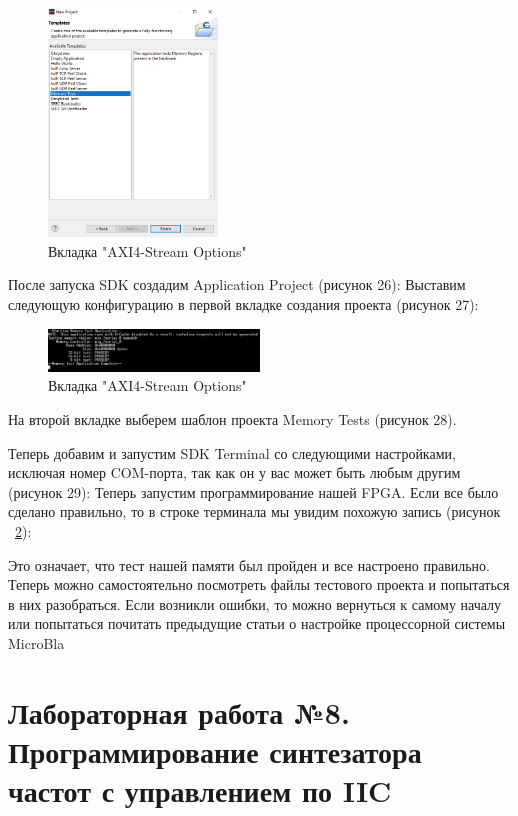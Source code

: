 \documentclass[a4paper,oneside ,10pt]{extreport}
\begin{document}
\begin{figure}[h]
	\centering
	\includegraphics[width=0.4\textwidth]{image/mig_m_sdk_1.png}
	\caption{Вкладка "AXI4-Stream Options"}
	\label{mig_m_sdk_1}
\end{figure}

    После запуска SDK создадим Application Project (рисунок 26):
    Выставим следующую конфигурацию в первой вкладке создания проекта (рисунок 27):
\begin{figure}[h]
	\centering
	\includegraphics[width=0.5\textwidth]{image/mig_result.png}
	\caption{Вкладка "AXI4-Stream Options"}
	\label{mig_result}
\end{figure}
    На второй вкладке выберем шаблон проекта Memory Tests (рисунок 28).

    Теперь добавим и запустим SDK Terminal со следующими настройками, исключая номер COM-порта, так как он у вас может быть любым другим (рисунок 29):
    Теперь запустим программирование нашей FPGA. Если все было сделано правильно, то в строке терминала мы увидим похожую запись (рисунок ~\ref{mig_result}):

 Это означает, что тест нашей памяти был пройден и все настроено правильно. Теперь можно самостоятельно посмотреть файлы тестового проекта и попытаться в них разобраться. Если возникли ошибки, то можно вернуться к самому началу или попытаться почитать предыдущие статьи о настройке процессорной системы MicroBla

\chapter{Лабораторная работа №8. Программирование синтезатора частот с управлением по IIC}
\end{document}
